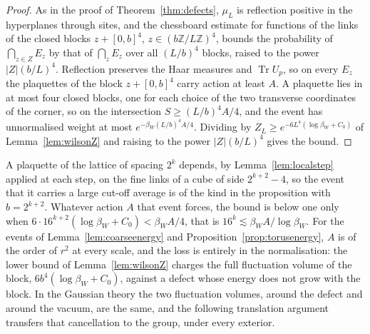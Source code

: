\documentclass[11pt]{amsart}
\theoremstyle{definition}
\theoremstyle{remark}
\numberwithin{equation}{section}
\newcommand{\Z}{\mathbb{Z}}
\newcommand{\Tr}{\operatorname{Tr}}
\begin{document}
\begin{proof}
As in the proof of Theorem~\ref{thm:defects}, $\mu_L$ is reflection
positive in the hyperplanes through sites, and the chessboard estimate for
functions of the links of the closed blocks $z+[0,b]^4$, $z\in(b\Z/L\Z)^4$,
bounds the probability of $\bigcap_{z\in Z}E_z$ by that of $\bigcap_{z}E_z$
over all $(L/b)^4$ blocks, raised to the power $|Z|(b/L)^4$. Reflection
preserves the Haar measures and $\Tr U_p$, so on every $E_z$ the plaquettes
of the block $z+[0,b]^4$ carry action at least $A$. A plaquette lies in at
most four closed blocks, one for each choice of the two transverse
coordinates of the corner, so on the intersection $S\ge(L/b)^4A/4$, and the
event has unnormalised weight at most $e^{-\beta_W(L/b)^4A/4}$. Dividing by
$Z_L\ge e^{-6L^4(\log\beta_W+C_0)}$ of Lemma~\ref{lem:wilsonZ} and raising
to the power $|Z|(b/L)^4$ gives the bound.
\end{proof}

A plaquette of the lattice of spacing $2^k$ depends, by
Lemma~\ref{lem:localstep} applied at each step, on the fine links of a cube
of side $2^{k+2}-4$, so the event that it carries a large cut-off average is of
the kind in the proposition with $b=2^{k+2}$. Whatever action $A$ that
event forces, the bound is below one only when $6\cdot16^{k+2}(\log\beta_W+
C_0)<\beta_WA/4$, that is $16^k\lesssim\beta_WA/\log\beta_W$. For the
events of Lemma~\ref{lem:coarseenergy} and
Proposition~\ref{prop:torusenergy}, $A$ is of the order of $r^2$ at every
scale, and the loss is entirely in the normalisation: the lower bound of
Lemma~\ref{lem:wilsonZ} charges the full fluctuation volume of the block,
$6b^4(\log\beta_W+C_0)$, against a defect whose energy does not grow with
the block. In the Gaussian theory the two fluctuation volumes, around the
defect and around the vacuum, are the same, and the following translation
argument transfers that cancellation to the group, under every exterior.
\end{document}
